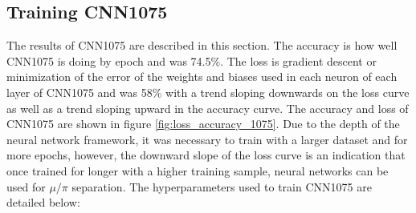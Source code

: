 \subsection{Training CNN1075}
The results of CNN1075 are described in this section. The accuracy is how well CNN1075 is doing by epoch and was 74.5\%. The loss is gradient descent or minimization of the error of the weights and biases used in each neuron of each layer of CNN1075 and was 58\% with a trend sloping downwards on the loss curve as well as a trend sloping upward in the accuracy curve. The accuracy and loss of CNN1075 are shown in figure \ref{fig:loss_accuracy_1075}. Due to the depth of the neural network framework, it was necessary to train with a larger dataset and for more epochs, however, the downward slope of the loss curve is an indication that once trained for longer with a higher training sample, neural networks can be used for $\mu/\pi$ separation. The hyperparameters used to train CNN1075 are detailed below: 

